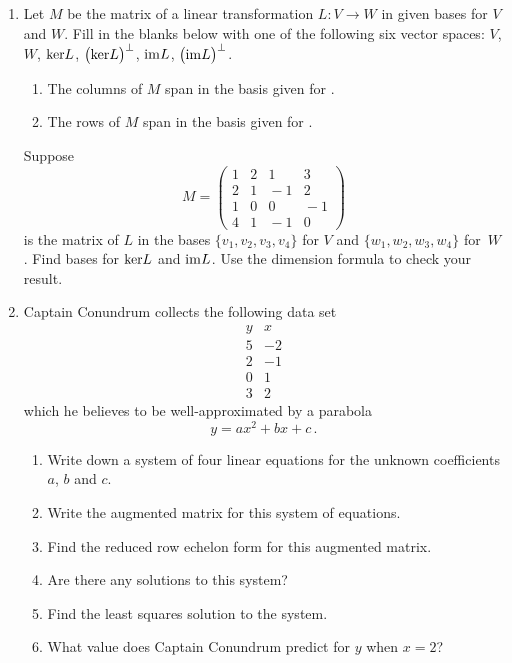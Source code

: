 \begin{enumerate}
\item Let $M$ be the matrix of a linear transformation $L:V\to W$ in given bases for $V$ and $W$.
Fill in the blanks below with one of the following six vector spaces: $V$, $W$, ${\rm ker} L$, 
$\big({\rm ker} L\big)^\perp$, ${\rm im} L$, $\big({\rm im} L\big)^\perp$.
\begin{enumerate}
\item The columns of $M$ span \underline{\phantom{answer}} in the basis given for \underline{\phantom{answer}}.
\item The rows of $M$ span \underline{\phantom{answer}} in the basis given for \underline{\phantom{answer}}.
\end{enumerate} 
Suppose $$M=\begin{pmatrix}1&2&1&3\\2&1&\!-1&2\\1&0&0&\!-1\\4&1&\!-1&0\end{pmatrix}$$
is the matrix of $L$ in the bases $\{v_1,v_2,v_3,v_4\}$ for $V$ and $\{w_1,w_2,w_3,w_4\}$ for~$W$.
Find bases for ${\rm ker} L$ and ${\rm im} L$. Use the dimension formula to check your result.

\item
Captain Conundrum collects the following data set
$$
\begin{array}{c|c}
y&x\\
\hline
5&-2\\
2&-1\\
0&1\\
3&2
\end{array}
$$
which he believes to be well-approximated by a parabola
$$
y=ax^2+bx+c\, .
$$

\begin{enumerate}
\item Write down a system of four linear equations for the unknown coefficients $a$, $b$ and $c$.
\item Write the augmented matrix for this system of equations.
\item Find the reduced row echelon form for this augmented matrix.
\item Are there any solutions to this system?
\item Find the least squares solution to the system.
\item What value does Captain Conundrum predict for $y$ when $x=2$? 
\end{enumerate}



\end{enumerate}
